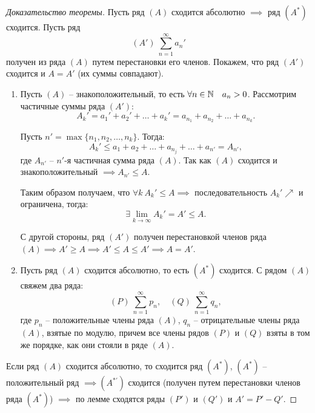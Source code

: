 \begin{proof}[Доказательство теоремы]
    Пусть ряд $ (A) $ сходится абсолютно $\implies$ ряд $ (A^*) $ сходится. Пусть ряд
    \[
        (A') \ \sum_{n=1}^{\infty}a_n'
    \]
    получен из ряда $(A)$ путем перестановки его членов. Покажем, что ряд $(A')$ сходится и $A = A'$ (их суммы совпадают).

    \begin{enumerate}
        \item Пусть $(A)$ -- знакоположительный, то есть $\forall n \in \mathbb{N} \quad a_n > 0$. Рассмотрим частичные суммы ряда $(A')$:
              \[
                  A_k' = a_1' + a_2' + \ldots + a_k' = a_{n_1} + a_{n_2} + \ldots + a_{n_k}.
              \]

              Пусть $n' = \max\{n_1,n_2,\ldots,n_k\}$. Тогда:
              \[
                  A_k' \leqslant a_1 + a_2 + \ldots + a_{n_j} + \ldots + a_{n'} = A_{n'},
              \]
              где $A_{n'}$ -- $n'$-я частичная сумма ряда $(A)$. Так как $(A)$ сходится и знакоположительный $\implies A_{n'} \leqslant A$.

              Таким образом получаем, что $\forall k \ A_k' \leqslant A \implies$ последовательность $A_k' \nearrow$ и ограничена, тогда:
              \[
                  \exists\underset{k\rightarrow\infty}{\lim}A_k' = A' \leqslant A.
              \]

              С другой стороны, ряд $(A')$ получен перестановкой членов ряда $(A) \implies A' \geqslant A \implies A' \leqslant A \leqslant A' \implies A = A'$.

        \item Пусть ряд $(A)$ сходится абсолютно, то есть $(A^*)$ сходится. С рядом $(A)$ свяжем два ряда:
              \[
                  (P) \ \sum_{n=1}^{\infty}p_n, \quad (Q) \ \sum_{n=1}^{\infty}q_n,
              \]
              где $p_n$ -- положительные члены ряда $(A)$, $q_n$ -- отрицательные члены ряда $(A)$, взятые по модулю, причем все члены рядов $(P)$ и $(Q)$ взяты в том же порядке, как они стояли в ряде $(A)$.
    \end{enumerate}

    Если ряд $(A)$ сходится абсолютно, то сходится ряд $(A^*)$, $(A^*)$ -- положительный ряд $\implies (A^{*'})$ сходится (получен путем перестановки членов ряда $(A^*)$) $\implies$ по лемме сходятся ряды $(P')$ и $(Q')$ и $A' = P' - Q'$.


\end{proof}
